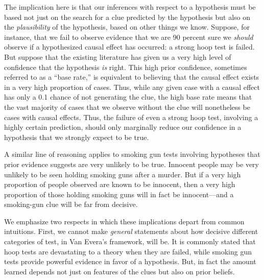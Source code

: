\documentclass[
  12pt,
]{book}
\begin{document}
The implication here is that our inferences with respect to a hypothesis must be based not just on the search for a clue predicted by the hypothesis but also on the \emph{plausibility} of the hypothesis, based on other things we know. Suppose, for instance, that we fail to observe evidence that we are 90 percent sure we \emph{should} observe if a hypothesized causal effect has occurred: a strong hoop test is failed. But suppose that the existing literature has given us a very high level of confidence that the hypothesis \emph{is} right. This high prior confidence, sometimes referred to as a ``base rate,'' is equivalent to believing that the causal effect exists in a very high proportion of cases. Thus, while any given case with a causal effect has only a 0.1 chance of not generating the clue, the high base rate means that the vast majority of cases that we observe without the clue will nonetheless be cases with causal effects. Thus, the failure of even a strong hoop test, involving a highly certain prediction, should only marginally reduce our confidence in a hypothesis that we strongly expect to be true.

A similar line of reasoning applies to smoking gun tests involving hypotheses that prior evidence suggests are very unlikely to be true. Innocent people may be very unlikely to be seen holding smoking guns after a murder. But if a very high proportion of people observed are known to be innocent, then a very high proportion of those holding smoking guns will in fact be innocent---and a smoking-gun clue will be far from decisive.

We emphasize two respects in which these implications depart from common intuitions. First, we cannot make \emph{general} statements about how decisive different categories of test, in Van Evera's framework, will be. It is commonly stated that hoop tests are devastating to a theory when they are failed, while smoking gun tests provide powerful evidence in favor of a hypothesis. But, in fact the amount learned depends not just on features of the clues but also on prior beliefs.
\end{document}
